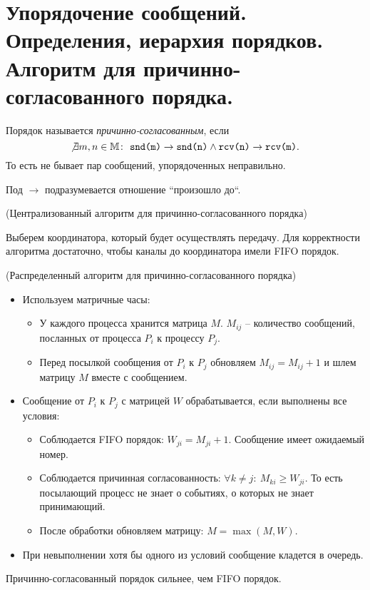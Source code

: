 \section{Упорядочение сообщений. Определения, иерархия порядков. Алгоритм для причинно-согласованного порядка.}

\begin{definition}
    Порядок называется \textit{причинно-согласованным}, если
    \[
        \not \exists m,n \in \mathbb{M} \colon~ \texttt{snd(m)} \rightarrow \texttt{snd(n)}
        \wedge \texttt{rcv(n)} \rightarrow \texttt{rcv(m)}
    .\]
    То есть не бывает пар сообщений, упорядоченных неправильно.
\end{definition}

\begin{remark}
    Под $\to$ подразумевается отношение ``произошло до``.
\end{remark}

\begin{algorithm}(Централизованный алгоритм для причинно-согласованного порядка)

    Выберем координатора, который будет осуществлять передачу. Для корректности алгоритма достаточно, чтобы каналы до координатора имели FIFO порядок.
\end{algorithm}

\begin{algorithm}(Распределенный алгоритм для причинно-согласованного порядка)

    \begin{itemize}
        \item Используем матричные часы:
        \begin{itemize}
            \item У каждого процесса хранится матрица $M$. $M_{ij}$ -- количество сообщений, посланных от процесса $P_i$ к процессу $P_j$.
            \item Перед посылкой сообщения от $P_i$ к $P_j$ обновляем $M_{ij} = M_{ij} + 1$ и шлем матрицу $M$ вместе с сообщением.
        \end{itemize}
        \item Сообщение от $P_i$ к $P_j$ с матрицей $W$ обрабатывается, если выполнены все условия:
        \begin{itemize}
            \item Соблюдается FIFO порядок: $W_{ji} = M_{ji} + 1$. Сообщение имеет ожидаемый номер.
            \item Соблюдается причинная согласованность: $\forall k \not = j \colon~ M_{ki} \geqslant W_{ji}$. То есть посылающий процесс не знает о событиях, о которых не знает принимающий.
            \item После обработки обновляем матрицу: $M = \max{(M, W)}$.
        \end{itemize}
        \item При невыполнении хотя бы одного из условий сообщение кладется в очередь.
    \end{itemize}

\end{algorithm}

\begin{remark}
    Причинно-согласованный порядок сильнее, чем FIFO порядок.
\end{remark}
